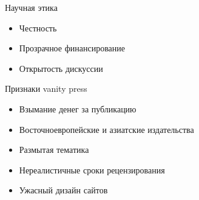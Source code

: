 \documentclass[aspectratio=169]{beamer}
\begin{document}
\begin{frame}{Научная этика}
\begin{itemize}
\item<+-> Честность
\item<+-> Прозрачное финансирование
\item<+-> Открытость дискуссии
\end{itemize}
\end{frame}



\begin{frame}{Признаки vanity press}
\begin{itemize}
\item<+-> Взымание денег за публикацию
\item<+-> Восточноевропейские и азиатские издательства
\item<+-> Размытая тематика
\item<+-> Нереалистичные сроки рецензирования
\item<+-> Ужасный дизайн сайтов
\end{itemize}
\end{frame}
\end{document}
